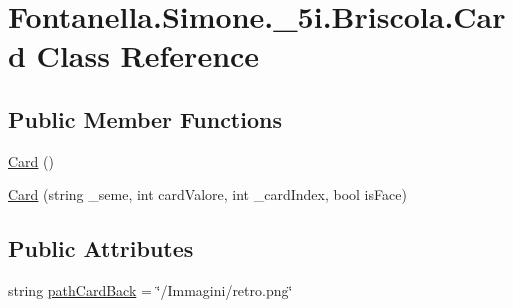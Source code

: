 \hypertarget{class_fontanella_1_1_simone_1_1__5i_1_1_briscola_1_1_card}{}\section{Fontanella.\+Simone.\+\_\+5i.\+Briscola.\+Card Class Reference}
\label{class_fontanella_1_1_simone_1_1__5i_1_1_briscola_1_1_card}
\subsection*{Public Member Functions}
\begin{DoxyCompactItemize}
\item 
\hyperlink{class_fontanella_1_1_simone_1_1__5i_1_1_briscola_1_1_card_a998d2e047284254fc568cbe8c2a49776}{Card} ()
\item 
\hyperlink{class_fontanella_1_1_simone_1_1__5i_1_1_briscola_1_1_card_a9a02483c6691e2a69cd4fd49d9587d1b}{Card} (string \+\_\+seme, int card\+Valore, int \+\_\+card\+Index, bool is\+Face)
\end{DoxyCompactItemize}
\subsection*{Public Attributes}
\begin{DoxyCompactItemize}
\item 
string \hyperlink{class_fontanella_1_1_simone_1_1__5i_1_1_briscola_1_1_card_a9876fd710f0cc6dd6ddf671a0a8ef0ad}{path\+Card\+Back} = \char`\"{}/Immagini/retro.\+png\char`\"{}
\end{DoxyCompactItemize}
